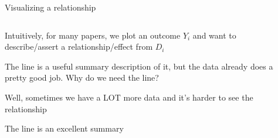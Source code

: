 \documentclass[notes,11pt, aspectratio=169]{beamer}
\newcommand\1{\operatorname{\mathbbm{1}}\indicatorfence}
\newenvironment{wideitemize}{\itemize\addtolength{\itemsep}{10pt}}{\enditemize}
\begin{document}
\begin{frame}{Visualizing a relationship}
  \begin{columns}[T] %
    \begin{column}{.5\textwidth}
      \begin{wideitemize}
  \item<1-> Intuitively, for many papers, we plot an outcome $Y_{i}$ and
    want to describe/assert a relationship/effect from $D_{i}$
  \item<1-> The line is a useful summary description of it, but the
    data already does a pretty good job. Why do we need the line?
  \item<2-> Well, sometimes we have a LOT more data and it's harder to
    see the relationship
  \item<2-> The line is an excellent summary
  \end{wideitemize}
  \end{column}%
  \hfill%
  \begin{column}{.5\textwidth}
  \end{column}
\end{columns}
\end{frame}
\end{document}

